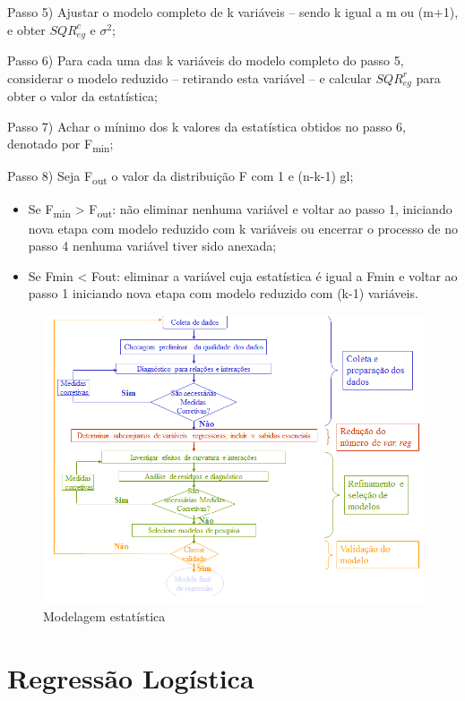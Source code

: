 \documentclass[12pt,brazil,oneside]{book}
\begin{document}
Passo 5) Ajustar o modelo completo de k variáveis -- sendo k igual a m
ou (m+1), e obter \(SQR^{c}_{eg}\) e \(\sigma^{2}\);

Passo 6) Para cada uma das k variáveis do modelo completo do passo 5,
considerar o modelo reduzido -- retirando esta variável -- e calcular
\(SQR^{r}_{eg}\) para obter o valor da estatística;

Passo 7) Achar o mínimo dos k valores da estatística obtidos no passo 6,
denotado por F\textsubscript{min};

Passo 8) Seja F\textsubscript{out} o valor da distribuição F com 1 e
(n-k-1) gl;

\begin{itemize}
\item
  Se F\textsubscript{min} \textgreater{} F\textsubscript{out}: não
  eliminar nenhuma variável e voltar ao passo 1, iniciando nova etapa
  com modelo reduzido com k variáveis ou encerrar o processo de no passo
  4 nenhuma variável tiver sido anexada;
\item
  Se Fmin \textless{} Fout: eliminar a variável cuja estatística é igual
  a Fmin e voltar ao passo 1 iniciando nova etapa com modelo reduzido
  com (k-1) variáveis.
\end{itemize}

\begin{figure}
\centering
\includegraphics{regress1.png}
\caption{Modelagem estatística}
\end{figure}

\hypertarget{regressao-logistica}{%
\chapter{Regressão Logística}\label{regressao-logistica}}
\end{document}
